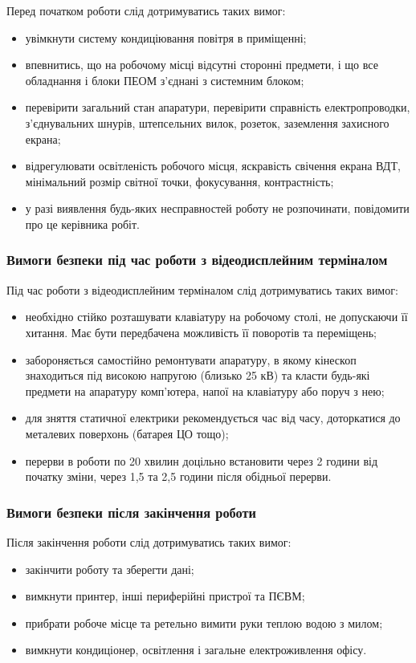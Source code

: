 Перед початком роботи слід дотримуватись таких вимог:
\begin{itemize}
  \item увімкнути систему кондиціювання повітря в приміщенні;
  \item впевнитись, що на робочому місці відсутні сторонні предмети, і що все обладнання і блоки ПЕОМ з'єднані з системним блоком;
  \item перевірити загальний стан апаратури, перевірити справність електропроводки, з'єднувальних шнурів, штепсельних вилок, розеток, заземлення захисного екрана;
  \item відрегулювати освітленість робочого місця, яскравість свічення екрана ВДТ, мінімальний розмір світної точки, фокусування, контрастність;
  \item у разі виявлення будь-яких несправностей роботу не розпочинати, повідомити про це керівника робіт.
\end{itemize}

\subsubsection{Вимоги безпеки під час роботи з відеодисплейним терміналом}

Під час роботи з відеодисплейним терміналом слід дотримуватись таких вимог:
\begin{itemize}
  \item необхідно стійко розташувати клавіатуру на робочому столі, не допускаючи її хитання.	Має бути передбачена можливість її поворотів та переміщень;
  \item забороняється самостійно ремонтувати апаратуру, в якому кінескоп знаходиться під високою напругою (близько 25 кВ) та класти будь-які предмети на апаратуру комп'ютера, напої на клавіатуру або поруч з нею;
  \item для зняття статичної електрики рекомендується час від часу, доторкатися до металевих поверхонь (батарея ЦО тощо);
  \item перерви в роботи по 20 хвилин доцільно встановити через 2 години від початку зміни, через 1,5 та 2,5 години після обідньої перерви.
\end{itemize}

\subsubsection{Вимоги безпеки після закінчення роботи}

Після закінчення роботи слід дотримуватись таких вимог:
\begin{itemize}
  \item закінчити роботу та зберегти дані;
  \item вимкнути принтер, інші периферійні пристрої та ПЄВМ;
  \item прибрати робоче місце та ретельно вимити руки теплою водою з милом;
  \item вимкнути кондиціонер, освітлення і загальне електроживлення офісу.
\end{itemize}

